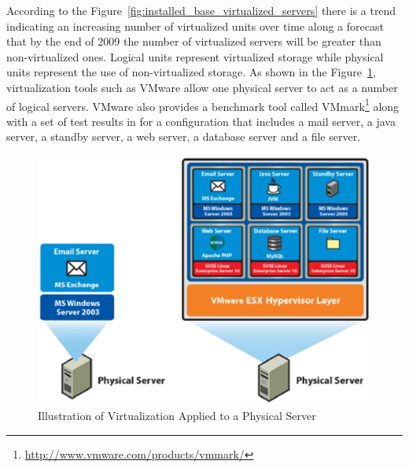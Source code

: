                 According to the Figure~\ref{fig:installed_base_virtualized_servers} there is a trend indicating an increasing number of virtualized units over time along a forecast that by the end of 2009 the number of virtualized servers will be greater than non-virtualized ones. Logical units represent virtualized storage while physical units represent the use of non-virtualized storage. As shown in the Figure~\ref{fig:illustration_virtualization_to_physical_server}, virtualization tools such as VMware allow one physical server to act as a number of logical servers. VMware also provides a benchmark tool called VMmark\footnote{\url{http://www.vmware.com/products/vmmark/}} along with a set of test results in \cite{Makhija06} for a configuration that includes a mail server, a java server, a standby server, a web server, a database server and a file server.
                \begin{figure}[h!tb]
                    \centering
                    \includegraphics[scale=0.7]{graphics/illustration_virtualization_to_physical_server}
                    \caption{Illustration of Virtualization Applied to a Physical Server}
                    \label{fig:illustration_virtualization_to_physical_server}
                \end{figure}
                
